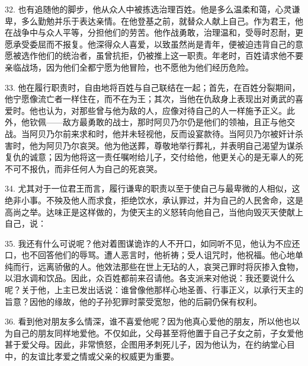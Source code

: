 32. 也有追随他的脚步，他从众人中被拣选治理百姓。他是多么温柔和蔼，心灵谦卑，多么勤勉并乐于表达亲情。在他登基之前，就替众人献上自己。作为君王，他在战争中与众人平等，分担他们的劳苦。他作战勇敢，治理温和，受辱时忍耐，更愿承受委屈而不报复。他深得众人喜爱，以致虽然尚是青年，便被迫违背自己的意愿被选作他们的统治者，虽曾抗拒，仍被推上这一职责。年老时，百姓请求他不要亲临战场，因为他们全都宁愿为他冒险，也不愿他为他们经历危险。\par

33. 他在履行职责时，自由地将百姓与自己联结在一起；首先，在百姓分裂期间，他宁愿像流亡者一样住在，而不在为王；其次，当他在仇敌身上表现出对勇武的喜爱时。他也认为，对那些曾与他为敌的人，应像对待自己的人一样施予正义。此外，他钦佩——敌方最勇敢的战士，那时阿贝乃尔仍是他们的领袖，且正与他交战。当阿贝乃尔前来求和时，他并未轻视他，反而设宴款待。当阿贝乃尔被奸计杀害时，他为阿贝乃尔哀哭。他为他送葬，尊敬地举行葬礼，并表明自己渴望为谋杀复仇的诚意；因为他将这一责任嘱咐给儿子，交付给他，他更关心的是无辜人的死不可不报仇，而非任何人为自己的死哀哭。\par

34. 尤其对于一位君王而言，履行谦卑的职责以至于使自己与最卑微的人相似，这绝非小事。不殃及他人而求食，拒绝饮水，承认罪过，并为自己的人民舍命，这是高尚之举。达味正是这样做的，为使天主的义怒转向他自己，当他向毁灭天使献上自己，说：\par

35. 我还有什么可说呢？他对着图谋诡诈的人不开口，如同听不见，他认为不应还口，也不回答他们的辱骂。遭人恶言时，他祈祷；受人诅咒时，他祝福。他心地单纯而行，远离骄傲的人。他效法那些在世上无玷的人，哀哭己罪时将灰掺入食物，以泪水调和饮品。因此，众百姓都前来召请他。各支派来对他说：我还要说什么呢？关于他，上主已发出话说：谁曾像他那样心地圣善、行事正义，以承行天主的旨意？因他的缘故，他的子孙犯罪时蒙受宽恕，他的后嗣仍保有权利。\par

36. 看到他对朋友多么情深，谁不喜爱他呢？因为他真心爱他的朋友，所以他也以为自己的朋友同样地爱他。不仅如此，父母甚至将他置于自己子女之前，子女爱他甚于爱父母。因此，非常愤怒，企图用矛刺死儿子，因为他认为，在约纳堂心目中，的友谊比孝爱之情或父亲的权威更为重要。\par

